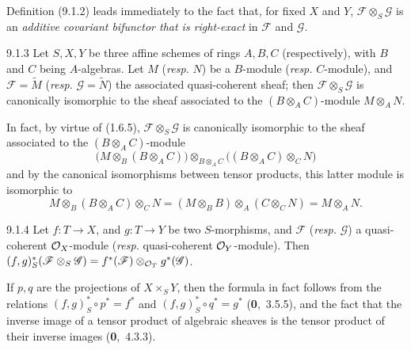 \documentclass[../main.tex]{subfiles}
\begin{document}
Definition (9.1.2) leads immediately to the fact that, for fixed $X$ and $Y$, $\mathscr{F}\otimes_S\mathscr{G}$ is an \emph{additive covariant bifunctor that is right-exact} in $\mathscr{F}$ and $\mathscr{G}$.

\begin{cx}[Proposition]{9.1.3}
    Let $S,X,Y$ be three affine schemes of rings $A,B,C$ (respectively), with $B$ and $C$ being $A$-algebras.
    Let $M$ (\emph{resp.} $N$) be a $B$-module (\emph{resp.} $C$-module), and $\mathscr{F}=\widetilde{M}$ (\emph{resp.} $\mathscr{G}=\widetilde{N}$) the associated quasi-coherent sheaf; then $\mathscr{F}\otimes_S\mathscr{G}$ is canonically isomorphic to the sheaf associated to the $(B\otimes_A C)$-module $M\otimes_A N$.
\end{cx}

In fact, by virtue of (1.6.5), $\mathscr{F}\otimes_S\mathscr{G}$ is canonically isomorphic to the sheaf associated to the $(B\otimes_A C)$-module
\begin{equation*}
    \big( M\otimes_B(B\otimes_A C) \big) \otimes_{B\otimes_A C} \big( (B\otimes_A C)\otimes_C N \big)
\end{equation*}
and by the canonical isomorphisms between tensor products, this latter module is isomorphic to
\begin{equation*}
    M\otimes_B(B\otimes_A C)\otimes_C N = (M\otimes_B B)\otimes_A(C\otimes_C N) = M\otimes_A N.
\end{equation*}

\begin{cx}[Proposition]{9.1.4}
    Let $f\colon T\to X$, and $g\colon T\to Y$ be two $S$-morphisms, and $\mathscr{F}$ (\emph{resp.} $\mathscr{G}$) a quasi-coherent $\mathcal{O}_X$-module (\emph{resp.} quasi-coherent $\mathcal{O}_Y$-module).
    Then $(f,g)^*_S(\mathscr{F}\otimes_S\mathscr{G}) = f^*(\mathscr{F})\otimes_{\mathcal{O}_T}g^*(\mathscr{G})$.
\end{cx}

If $p,q$ are the projections of $X\times_S Y$, then the formula in fact follows from the relations $(f,g)^*_S\circ p^*=f^*$ and $(f,g)^*_S\circ q^*=g^*$ (\textbf{0},~3.5.5), and the fact that the inverse image of a tensor product of algebraic sheaves is the tensor product of their inverse images (\textbf{0},~4.3.3).

\end{document}
